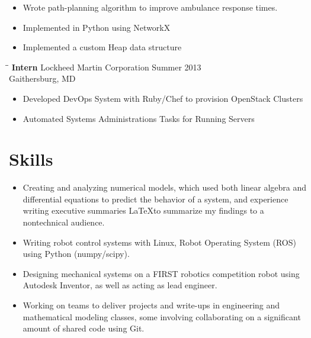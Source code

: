 \documentclass[12pt]{res}
\begin{document}
\begin{resume}
	\vspace{-45pt}
	\begin{itemize}
	\item Wrote path-planning algorithm to improve ambulance response times.
	\vspace{-10pt}
	\item Implemented in Python using NetworkX
	\vspace{-10pt}
	\item Implemented a custom Heap data structure
	\end{itemize}
    
    \begin{tabbing}
    \hspace{2.3in}\= \hspace{2.6in}\= \kill %
    \textbf{ Intern } \> Lockheed Martin Corporation \> Summer 2013\\
                  \> Gaithersburg, MD
    \end{tabbing}\vspace{-10pt}

	\vspace{-20pt}
	\begin{itemize}
	\item Developed DevOps System with Ruby/Chef to provision 
		OpenStack Clusters
	\vspace{-10pt} 
	\item Automated Systems Administrations Tasks for Running Servers
	\end{itemize}

  \section{Skills}
	\noindent
	\begin{itemize}
	\item Creating and analyzing numerical models, which used both 
		linear algebra and differential equations to predict the behavior of a system, 
		and experience writing executive summaries \LaTeX to summarize my findings to a nontechnical audience.
	\item Writing robot control systems with Linux, Robot Operating System
		(ROS) using Python (numpy/scipy).
	\item Designing mechanical systems on a FIRST robotics
		competition robot using Autodesk Inventor, 
		as well as acting as lead engineer.
	\item Working on teams to deliver projects and write-ups
		in engineering and mathematical modeling classes,
		some involving collaborating on a significant amount of shared
		code using Git.
	\end{itemize}


\end{resume}
\end{document}
